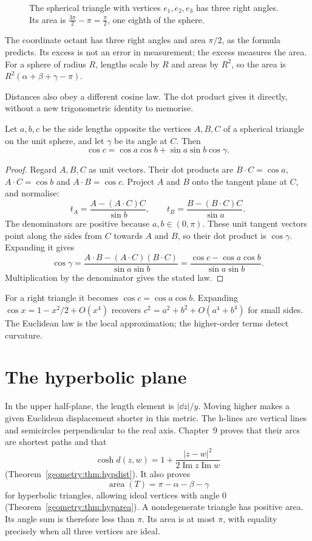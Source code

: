 \begin{figure}[ht]
\centering
{}
\caption{The spherical triangle with vertices $e_1,e_2,e_3$ has three right angles. Its area is $\frac{3\pi}2-\pi=\frac\pi2$, one eighth of the sphere.}
\label{geometry:fig:sphere}
\end{figure}

The coordinate octant has three right angles and area $\pi/2$, as the
formula predicts. Its excess is not an error in measurement; the excess
measures the area. For a sphere of radius $R$, lengths scale by $R$ and
areas by $R^2$, so the area is $R^2(\alpha+\beta+\gamma-\pi)$.

Distances also obey a different cosine law. The dot product gives it
directly, without a new trigonometric identity to memorise.

\begin{proposition}\label{geometry:prop:sphcos}
Let $a,b,c$ be the side lengths opposite the vertices $A,B,C$ of a
spherical triangle on the unit sphere, and let $\gamma$ be its angle at $C$.
Then
\[
 \cos c=\cos a\cos b+\sin a\sin b\cos\gamma.
\]
\end{proposition}
\begin{proof}
Regard $A,B,C$ as unit vectors. Their dot products are
$B\cdot C=\cos a$, $A\cdot C=\cos b$ and $A\cdot B=\cos c$.
Project $A$ and $B$ onto the tangent plane at $C$, and normalise:
\[
 t_A=\frac{A-(A\cdot C)C}{\sin b},\qquad
 t_B=\frac{B-(B\cdot C)C}{\sin a}.
\]
The denominators are positive because $a,b\in(0,\pi)$. These unit tangent
vectors point along the sides from $C$ towards $A$ and $B$, so their dot
product is $\cos\gamma$. Expanding it gives
\[
 \cos\gamma
 =\frac{A\cdot B-(A\cdot C)(B\cdot C)}{\sin a\sin b}
 =\frac{\cos c-\cos a\cos b}{\sin a\sin b}.
\]
Multiplication by the denominator gives the stated law.
\end{proof}

For a right triangle it becomes $\cos c=\cos a\cos b$.
Expanding $\cos x=1-x^2/2+O(x^4)$ recovers
$c^2=a^2+b^2+O(a^4+b^4)$ for small sides. The Euclidean law is the local
approximation; the higher-order terms detect curvature.

\section{The hyperbolic plane}

In the upper half-plane, the length element is $|\dd z|/y$.
Moving higher makes a given Euclidean displacement shorter in this metric.
The h-lines are vertical lines and semicircles perpendicular to the real
axis. Chapter~9 proves that their arcs are shortest paths and that
\[
 \cosh d(z,w)=1+\frac{|z-w|^2}
 {2\operatorname{Im}z\operatorname{Im}w}
\]
(Theorem~\ref{geometry:thm:hypdist}). It also proves
\[
 \operatorname{area}(T)=\pi-\alpha-\beta-\gamma
\]
for hyperbolic triangles, allowing ideal vertices with angle $0$
(Theorem~\ref{geometry:thm:hyparea}). A nondegenerate triangle has positive
area. Its angle sum is therefore less than $\pi$. Its area is at most
$\pi$, with equality precisely when all three vertices are ideal.

